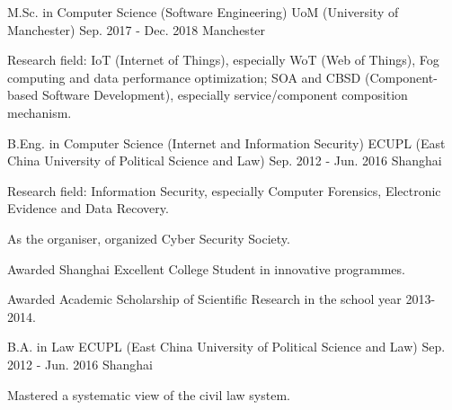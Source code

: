 \begin{cventries}
  \cventry
    {M.Sc. in Computer Science (Software Engineering)}
    {UoM (University of Manchester)}
    {Sep. 2017 - Dec. 2018}
    {Manchester}
    {
      \begin{cvitems}
        \item {Research field: IoT (Internet of Things), especially WoT (Web of Things), Fog computing and data performance optimization; SOA and CBSD (Component-based Software Development), especially service/component composition mechanism.}
      \end{cvitems}
    }
    
  \cventry
    {B.Eng. in Computer Science (Internet and Information Security)}
    {ECUPL (East China University of Political Science and Law)}
    {Sep. 2012 - Jun. 2016}
    {Shanghai}
    {
      \begin{cvitems}
        \item {Research field: Information Security, especially Computer Forensics, Electronic Evidence and Data Recovery.}
        \item {As the organiser, organized Cyber Security Society.}
        \item {Awarded Shanghai Excellent College Student in innovative programmes.}
        \item {Awarded Academic Scholarship of Scientific Research in the school year 2013-2014.}
      \end{cvitems}
    }
    
  \cventry
    {B.A. in Law}
    {ECUPL (East China University of Political Science and Law)}
    {Sep. 2012 - Jun. 2016}
    {Shanghai}
    {
      \begin{cvitems}
        \item {Mastered a systematic view of the civil law system.}
      \end{cvitems}
    }
\end{cventries}
